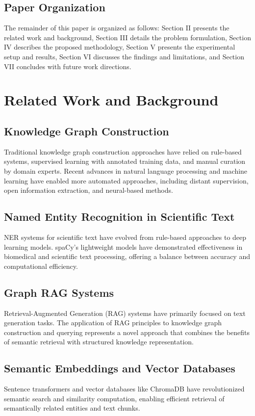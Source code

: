 \documentclass[conference]{IEEEtran}
\begin{document}
\subsection{Paper Organization}
The remainder of this paper is organized as follows: Section II presents the related work and background, Section III details the problem formulation, Section IV describes the proposed methodology, Section V presents the experimental setup and results, Section VI discusses the findings and limitations, and Section VII concludes with future work directions.

\section{Related Work and Background}

\subsection{Knowledge Graph Construction}
Traditional knowledge graph construction approaches have relied on rule-based systems, supervised learning with annotated training data, and manual curation by domain experts. Recent advances in natural language processing and machine learning have enabled more automated approaches, including distant supervision, open information extraction, and neural-based methods.

\subsection{Named Entity Recognition in Scientific Text}
NER systems for scientific text have evolved from rule-based approaches to deep learning models. spaCy's lightweight models have demonstrated effectiveness in biomedical and scientific text processing, offering a balance between accuracy and computational efficiency.

\subsection{Graph RAG Systems}
Retrieval-Augmented Generation (RAG) systems have primarily focused on text generation tasks. The application of RAG principles to knowledge graph construction and querying represents a novel approach that combines the benefits of semantic retrieval with structured knowledge representation.

\subsection{Semantic Embeddings and Vector Databases}
Sentence transformers and vector databases like ChromaDB have revolutionized semantic search and similarity computation, enabling efficient retrieval of semantically related entities and text chunks.
\end{document}
